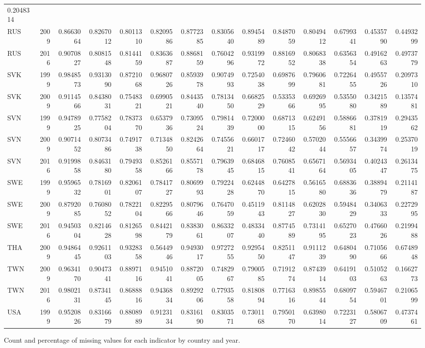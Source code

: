 \documentclass[]{article}
\begin{document}
\begin{longtable}[]{@{}lrrrrrrrrrrrrr@{}}
0.2048314\tabularnewline
RUS & 2009 & 0.8663064 & 0.8267012 & 0.8011310 & 0.8209586 & 0.8772385 &
0.8305640 & 0.8945489 & 0.8487059 & 0.8049412 & 0.6799341 & 0.4535790 &
0.4493299\tabularnewline
RUS & 2016 & 0.9070827 & 0.8081548 & 0.8144159 & 0.8363687 & 0.8868159 &
0.7604296 & 0.9319972 & 0.8816952 & 0.8068338 & 0.6356354 & 0.4916263 &
0.4973779\tabularnewline
SVK & 1999 & 0.9848573 & 0.9313090 & 0.8721068 & 0.9680726 & 0.8593978 &
0.9074993 & 0.7254038 & 0.6987699 & 0.7960681 & 0.7226455 & 0.4955726 &
0.2097310\tabularnewline
SVK & 2009 & 0.9114566 & 0.8438031 & 0.7548321 & 0.6990521 & 0.8443540 &
0.7813450 & 0.6682529 & 0.5335366 & 0.6926995 & 0.5355080 & 0.3421589 &
0.1357481\tabularnewline
SVN & 1999 & 0.9478925 & 0.7758204 & 0.7837370 & 0.6537936 & 0.7309524 &
0.7981439 & 0.7200000 & 0.6871315 & 0.6249156 & 0.5886681 & 0.3781919 &
0.2943562\tabularnewline
SVN & 2009 & 0.9071452 & 0.8073486 & 0.7491738 & 0.7134850 & 0.8242664 &
0.7455621 & 0.6601717 & 0.7246042 & 0.5702044 & 0.5556657 & 0.3439974 &
0.2537019\tabularnewline
SVN & 2016 & 0.9199858 & 0.8463180 & 0.7949358 & 0.8526166 & 0.8557178 &
0.7963945 & 0.6846815 & 0.7608541 & 0.6567164 & 0.5693405 & 0.4024347 &
0.2613475\tabularnewline
SWE & 1999 & 0.9596532 & 0.7816901 & 0.8206107 & 0.7841727 & 0.8069993 &
0.7922428 & 0.6244870 & 0.6427815 & 0.5616580 & 0.6883636 & 0.3889479 &
0.2114187\tabularnewline
SWE & 2009 & 0.8792085 & 0.7608052 & 0.7822104 & 0.8229566 & 0.8079646 &
0.7647059 & 0.4511943 & 0.8114827 & 0.6202830 & 0.5948429 & 0.3406333 &
0.2272995\tabularnewline
SWE & 2016 & 0.9450304 & 0.8214628 & 0.8126598 & 0.8442179 & 0.8383061 &
0.8633207 & 0.4833440 & 0.8774589 & 0.7314195 & 0.6527023 & 0.4766026 &
0.2199488\tabularnewline
THA & 2009 & 0.9486445 & 0.9261103 & 0.9328358 & 0.5644946 & 0.9493017 &
0.9727255 & 0.9295450 & 0.8251147 & 0.9111239 & 0.6480490 & 0.7105666 &
0.6748948\tabularnewline
TWN & 2009 & 0.9634170 & 0.9047341 & 0.8897116 & 0.9451041 & 0.8872005 &
0.7482967 & 0.7900585 & 0.7191274 & 0.8743914 & 0.6419103 & 0.5105263 &
0.1662773\tabularnewline
TWN & 2016 & 0.9802131 & 0.8734145 & 0.8688816 & 0.9436834 & 0.8929206 &
0.7793558 & 0.8180894 & 0.7716316 & 0.8985544 & 0.6809754 & 0.5946701 &
0.2106599\tabularnewline
USA & 1999 & 0.9520826 & 0.8316679 & 0.8808989 & 0.9123134 & 0.8316190 &
0.8303571 & 0.7301168 & 0.7950170 & 0.6398014 & 0.7223127 & 0.5806709 &
0.4737461\tabularnewline
\bottomrule
\end{longtable}

Count and percentage of missing values for each indicator by country and
year.
\end{document}

